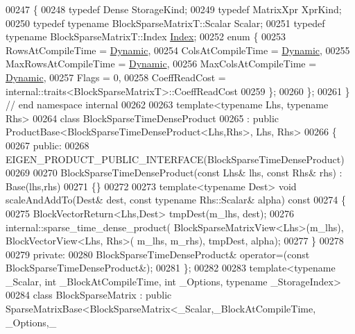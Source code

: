 \begin{DoxyCode}
00247 \{
00248   \textcolor{keyword}{typedef} Dense StorageKind;
00249   \textcolor{keyword}{typedef} MatrixXpr XprKind;
00250   \textcolor{keyword}{typedef} \textcolor{keyword}{typename} BlockSparseMatrixT::Scalar Scalar;
00251   \textcolor{keyword}{typedef} \textcolor{keyword}{typename} BlockSparseMatrixT::Index \hyperlink{namespace_eigen_a62e77e0933482dafde8fe197d9a2cfde}{Index};
00252   \textcolor{keyword}{enum} \{
00253     RowsAtCompileTime = \hyperlink{namespace_eigen_ad81fa7195215a0ce30017dfac309f0b2}{Dynamic},
00254     ColsAtCompileTime = \hyperlink{namespace_eigen_ad81fa7195215a0ce30017dfac309f0b2}{Dynamic},
00255     MaxRowsAtCompileTime = \hyperlink{namespace_eigen_ad81fa7195215a0ce30017dfac309f0b2}{Dynamic},
00256     MaxColsAtCompileTime = \hyperlink{namespace_eigen_ad81fa7195215a0ce30017dfac309f0b2}{Dynamic},
00257     Flags = 0,
00258     CoeffReadCost = internal::traits<BlockSparseMatrixT>::CoeffReadCost
00259   \};
00260 \};
00261 \} \textcolor{comment}{// end namespace internal}
00262 
00263 \textcolor{keyword}{template}<\textcolor{keyword}{typename} Lhs, \textcolor{keyword}{typename} Rhs>
00264 \textcolor{keyword}{class }BlockSparseTimeDenseProduct
00265   : \textcolor{keyword}{public} ProductBase<BlockSparseTimeDenseProduct<Lhs,Rhs>, Lhs, Rhs>
00266 \{
00267   \textcolor{keyword}{public}:
00268     EIGEN\_PRODUCT\_PUBLIC\_INTERFACE(BlockSparseTimeDenseProduct)
00269 
00270     BlockSparseTimeDenseProduct(\textcolor{keyword}{const} Lhs& lhs, \textcolor{keyword}{const} Rhs& rhs) : Base(lhs,rhs)
00271     \{\}
00272 
00273     \textcolor{keyword}{template}<\textcolor{keyword}{typename} Dest> \textcolor{keywordtype}{void} scaleAndAddTo(Dest& dest, \textcolor{keyword}{const} \textcolor{keyword}{typename} Rhs::Scalar& alpha)\textcolor{keyword}{ const}
00274 \textcolor{keyword}{    }\{
00275       BlockVectorReturn<Lhs,Dest> tmpDest(m\_lhs, dest);
00276       internal::sparse\_time\_dense\_product( BlockSparseMatrixView<Lhs>(m\_lhs),  BlockVectorView<Lhs, Rhs>(
      m\_lhs, m\_rhs), tmpDest, alpha);
00277     \}
00278 
00279   \textcolor{keyword}{private}:
00280     BlockSparseTimeDenseProduct& operator=(\textcolor{keyword}{const} BlockSparseTimeDenseProduct&);
00281 \};
00282 
00283 \textcolor{keyword}{template}<\textcolor{keyword}{typename} \_Scalar, \textcolor{keywordtype}{int} \_BlockAtCompileTime, \textcolor{keywordtype}{int} \_Options, \textcolor{keyword}{typename} \_StorageIndex>
00284 \textcolor{keyword}{class }BlockSparseMatrix : \textcolor{keyword}{public} SparseMatrixBase<BlockSparseMatrix<\_Scalar,\_BlockAtCompileTime, \_Options,\_

\end{DoxyCode}
